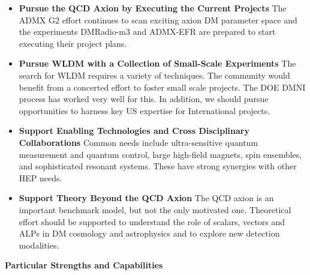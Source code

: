 \documentclass[nofootinbib]{article}
\begin{document}
\begin{itemize}[leftmargin=1.0em]
\item {\bf Pursue the QCD Axion by Executing the Current Projects}
The ADMX G2 effort continues to scan exciting axion DM parameter space and the experiments DMRadio-m3 and ADMX-EFR are prepared to start executing their project plans.

\item {\bf Pursue WLDM with a Collection of Small-Scale Experiments}
The search for WLDM requires a variety of techniques. The community would benefit from a concerted effort to foster small scale projects. The DOE DMNI process has worked very well for this.  In addition, we should pursue opportunities to harness key US expertise for International projects.

\item {\bf Support Enabling Technologies and Cross Disciplinary Collaborations}
Common needs include ultra-sensitive quantum measurement and quantum control, large high-field magnets, spin ensembles, and sophisticated resonant systems. These have strong synergies with other HEP needs.

\item {\bf Support Theory Beyond the QCD Axion}
The QCD axion is an important benchmark model, but not the only motivated one. Theoretical effort should be supported to understand the role of scalars, vectors and ALPs in DM cosmology and astrophysics and to explore new detection modalities.
\end{itemize}

\vspace{1em}
\noindent
{\bf Particular Strengths and Capabilities}

\end{document}
